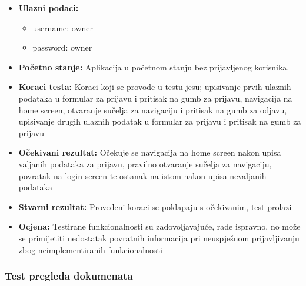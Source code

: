 			\begin{itemize}
				
				\item{\textbf{Ulazni podaci:}}
				\begin{itemize}
					\item{username: owner}
					\item{password: owner}
				\end{itemize}
				
				\item{\textbf{Početno stanje:} Aplikacija u početnom stanju bez prijavljenog korisnika.}
				
				\item{\textbf{Koraci testa:} Koraci koji se provode u testu jesu; upisivanje prvih ulaznih podataka u formular za prijavu i pritisak na gumb za prijavu, navigacija na home screen, otvaranje sučelja za navigaciju i pritisak na gumb za odjavu, upisivanje drugih ulaznih podatak u formular za prijavu i pritisak na gumb za prijavu}
				
				\item{\textbf{Očekivani rezultat:} Očekuje se navigacija na home screen nakon upisa valjanih podataka za prijavu, pravilno otvaranje sučelja za navigaciju, povratak na login screen te ostanak na istom nakon upisa nevaljanih podataka}
				
				\item{\textbf{Stvarni rezultat:} Provedeni koraci se poklapaju s očekivanim, test prolazi}
				
				\item{\textbf{Ocjena:} Testirane funkcionalnosti su zadovoljavajuće, rade ispravno, no može se primijetiti nedostatak povratnih informacija pri neuspješnom prijavljivanju zbog neimplementiranih funkcionalnosti}
				
			\end{itemize}
			
			\subsubsection{Test pregleda dokumenata}
			

